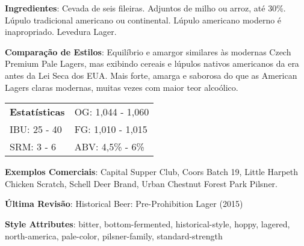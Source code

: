 \textbf{Ingredientes}: Cevada de seis fileiras. Adjuntos de milho ou arroz, até 30\%. Lúpulo tradicional americano ou continental. Lúpulo americano moderno é inapropriado. Levedura Lager.

\textbf{Comparação de Estilos}: Equilíbrio e amargor similares às modernas Czech Premium Pale Lagers, mas exibindo cereais e lúpulos nativos americanos da era antes da Lei Seca dos EUA. Mais forte, amarga e saborosa do que as American Lagers claras modernas, muitas vezes com maior teor alcoólico.

\begin{tabular}{@{}p{35mm}p{35mm}@{}}
  \textbf{Estatísticas} & OG: 1,044 - 1,060  \\
  IBU: 25 - 40  & FG: 1,010 - 1,015  \\
  SRM: 3 - 6 & ABV: 4,5\% - 6\%
\end{tabular}

\textbf{Exemplos Comerciais}: Capital Supper Club, Coors Batch 19, Little Harpeth Chicken Scratch, Schell Deer Brand, Urban Chestnut Forest Park Pilsner.

\textbf{Última Revisão}: Historical Beer: Pre-Prohibition Lager (2015)

\textbf{Style Attributes}: bitter, bottom-fermented, historical-style, hoppy, lagered, north-america, pale-color, pilsner-family, standard-strength

